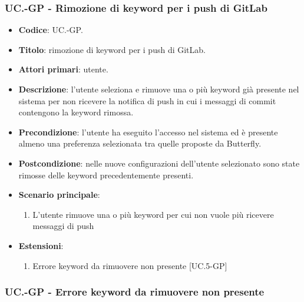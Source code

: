 	\subsubsection{UC\theuccount.\thesubuccount-GP - Rimozione di keyword per i push di GitLab}
	\begin{itemize}
		\item \textbf{Codice}: UC\theuccount.\thesubuccount-GP.
		\item \textbf{Titolo}: rimozione di keyword per i push di GitLab.
		\item \textbf{Attori primari}: utente.
		\item \textbf{Descrizione}: l’utente seleziona e rimuove una o più keyword già presente nel sistema per non ricevere la notifica di push in
		cui i messaggi di commit contengono la keyword rimossa.
		\item \textbf{Precondizione}: l’utente ha eseguito l'accesso nel sistema ed è presente almeno
        una preferenza selezionata tra quelle proposte da Butterfly.
		\item \textbf{Postcondizione}: nelle nuove configurazioni dell'utente selezionato sono state rimosse delle keyword precedentemente presenti.
		\item \textbf{Scenario principale}:
		\begin{enumerate}
			\item L'utente rimuove una o più keyword per cui non vuole più ricevere messaggi di push
		\end{enumerate}
		\item \textbf{Estensioni}:
		\begin{enumerate}
			\item Errore keyword da rimuovere non presente [UC\theuccount.5-GP]
		\end{enumerate}
	\end{itemize}

	\subsubsection{UC\theuccount.\thesubuccount-GP - Errore keyword da rimuovere non presente}

